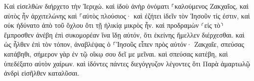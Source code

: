 \documentclass{openreader}
\begin{document}
Καὶ εἰσελθὼν διήρχετο τὴν Ἰεριχώ. 
καὶ ἰδοὺ ἀνὴρ ὀνόματι ⸀καλούμενος Ζακχαῖος, καὶ αὐτὸς ἦν ἀρχιτελώνης καὶ ⸀αὐτὸς πλούσιος· 
καὶ ἐζήτει ἰδεῖν τὸν Ἰησοῦν τίς ἐστιν, καὶ οὐκ ἠδύνατο ἀπὸ τοῦ ὄχλου ὅτι τῇ ἡλικίᾳ μικρὸς ἦν. 
καὶ προδραμὼν ⸂εἰς τὸ⸃ ἔμπροσθεν ἀνέβη ἐπὶ συκομορέαν ἵνα ἴδῃ αὐτόν, ὅτι ἐκείνης ἤμελλεν διέρχεσθαι. 
καὶ ὡς ἦλθεν ἐπὶ τὸν τόπον, ἀναβλέψας ὁ ⸀Ἰησοῦς εἶπεν πρὸς αὐτόν· Ζακχαῖε, σπεύσας κατάβηθι, σήμερον γὰρ ἐν τῷ οἴκῳ σου δεῖ με μεῖναι. 
καὶ σπεύσας κατέβη, καὶ ὑπεδέξατο αὐτὸν χαίρων. 
καὶ ἰδόντες πάντες διεγόγγυζον λέγοντες ὅτι Παρὰ ἁμαρτωλῷ ἀνδρὶ εἰσῆλθεν καταλῦσαι. 
\end{document}
